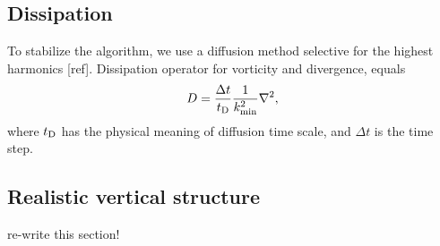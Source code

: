 \documentclass[usenatbib,onecolumn]{mnras}
\newcommand{\alert}[1]{\color{red} #1\color{black}}
\begin{document}
\subsection{Dissipation}

To stabilize the algorithm, we use a diffusion method selective for the
highest harmonics [ref]. Dissipation operator for vorticity and
divergence, equals
\begin{equation}
\displaystyle  D = \frac{\Delta t}{t_{\rm D}} \frac{1}{k_{\rm min}^2}\nabla^2 ,
\end{equation}
where $t_{\rm D}$ has the physical meaning of diffusion time scale, and
$\Delta t$ is the time step. 

\subsection{Realistic vertical structure}

\alert{re-write this section!}
\end{document}
